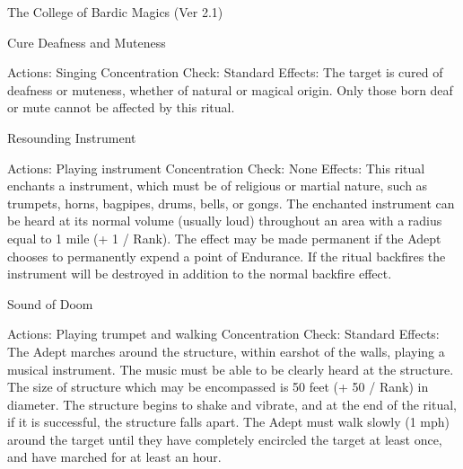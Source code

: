 \begin{Chapter}{The College of Bardic Magics (Ver 2.1)}
\begin{ritual}[R-1]{Cure Deafness and Muteness }

Actions: Singing 
Concentration Check: Standard 
Effects:  The  target  is  cured  of  deafness  or  muteness,  whether  of  natural  or  magical  origin.  Only 
those born deaf or mute cannot be affected by this 
ritual. 
\end{ritual}

\begin{ritual}[R-2]{Resounding Instrument }

Actions: Playing instrument  
Concentration Check: None 
Effects:  This  ritual  enchants  a  instrument,  which 
must  be  of  religious  or  martial  nature,  such  as 
trumpets,  horns,  bagpipes,  drums,  bells,  or  gongs. 
The  enchanted  instrument  can  be  heard  at  its  normal volume (usually loud) throughout an area with 
a  radius  equal  to  1  mile  (+  1  /  Rank).  The  effect 
may  be  made  permanent  if  the  Adept  chooses  to 
permanently  expend  a  point  of  Endurance.  If  the 
ritual backfires the instrument will be destroyed in 
addition to the normal backfire effect. 
\end{ritual}

\begin{ritual}[R-3]{Sound of Doom }

Actions: Playing trumpet and walking 
Concentration Check: Standard 
Effects:  The  Adept  marches  around  the  structure, 
within  earshot  of  the  walls,  playing  a  musical  instrument.  The  music  must  be  able  to  be  clearly 
heard  at  the  structure.  The  size  of  structure  which 
may  be  encompassed  is  50  feet  (+  50  /  Rank)  in 
diameter.  The  structure  begins  to  shake  and  vibrate, and at the end of the ritual, if it is successful, 
the  structure  falls  apart.  The  Adept  must  walk 
slowly  (1  mph)  around  the  target  until  they  have 
completely  encircled  the  target  at  least  once,  and 
have marched for at least an hour. 
\end{ritual}


\end{Chapter}
